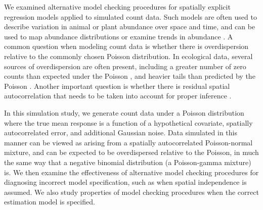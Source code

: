 \documentclass[12pt,english]{article}
\begin{document}
\begin{spacing}{1.9}
We examined alternative model checking procedures for spatially explicit regression models applied to simulated count data.  Such models are often used to describe variation in animal or plant abundance over space and time, and can be used to map abundance distributions or examine trends in abundance \citep[e.g.,][]{SauerLink2011,ConnEtAl2014}.  A common question when modeling count data is whether there is overdispersion relative to the commonly chosen Poisson distribution.  In ecological data, several sources of overdispersion are often present, including a greater number of zero counts than expected under the Poisson \citep[zero inflation;][]{AgarwalEtAl2002}, and heavier tails than predicted by the Poisson \citep{PottsElith2006,VerHoefBoveng2007}.  Another important question is whether there is residual spatial autocorrelation that needs to be taken into account for proper inference \citep{Legendre1993,LichsteinEtAl2002}.

In this simulation study, we generate count data under a Poisson distribution where the true mean response is a function of a hypothetical covariate, spatially autocorrelated error, and additional Gaussian noise.  Data simulated in this manner can be viewed as arising from a spatially autocorrelated Poisson-normal mixture, and can be expected to be overdispersed relative to the Poisson, in much the same way that a negative binomial distribution (a Poisson-gamma mixture) is.  We then examine the effectiveness of alternative model checking procedures for diagnosing incorrect model specification, such as when spatial independence is assumed.  We also study properties of model checking procedures when the correct estimation model is specified.


\end{spacing}
\end{document}
